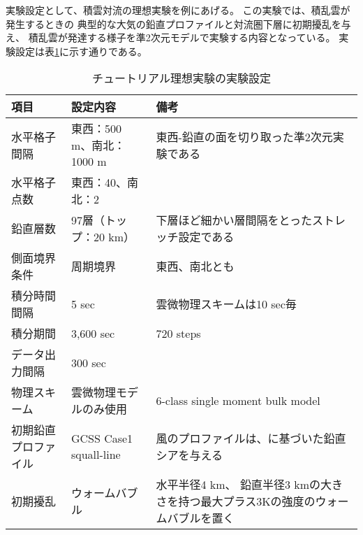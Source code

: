 実験設定として、積雲対流の理想実験を例にあげる。
この実験では、積乱雲が発生するときの
典型的な大気の鉛直プロファイルと対流圏下層に初期擾乱を与え、
積乱雲が発達する様子を準2次元モデルで実験する内容となっている。
実験設定は表\ref{tab:setting_ideal}に示す通りである。

\begin{table}[htb]
\begin{center}
\caption{チュートリアル理想実験の実験設定}
\begin{tabularx}{150mm}{|l|X|X|} \hline
 \rowcolor[gray]{0.9} 項目 & 設定内容 & 備考 \\ \hline
 水平格子間隔 & 東西：500 m、南北：1000 m & 東西-鉛直の面を切り取った準2次元実験である \\ \hline
 水平格子点数 & 東西：40、南北：2\footnotemark &  \\ \hline
 鉛直層数     & 97層（トップ：20 km）& 下層ほど細かい層間隔をとったストレッチ設定である \\ \hline
 側面境界条件 & 周期境界 & 東西、南北とも \\ \hline
 積分時間間隔 & 5 sec      & 雲微物理スキームは10 sec毎 \\ \hline
 積分期間     & 3,600 sec  & 720 steps \\ \hline
 データ出力間隔 & 300 sec  &  \\ \hline
 物理スキーム & 雲微物理モデルのみ使用 &
 6-class single moment bulk model \citep{tomita_2008} \\ \hline
 初期鉛直プロファイル & GCSS Case1 squall-line \citep{Redelsperger2000}&
 風のプロファイルは、\citet{Ooyama_2001}に基づいた鉛直シアを与える \\ \hline
 初期擾乱 & ウォームバブル & 水平半径4 km、
 鉛直半径3 kmの大きさを持つ最大プラス3Kの強度のウォームバブルを置く\\ \hline
\end{tabularx}
\label{tab:setting_ideal}
\end{center}
\end{table}








